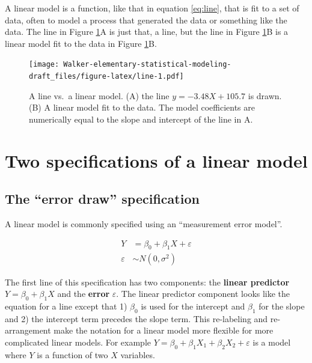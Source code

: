 \documentclass[]{book}
\begin{document}
A linear model is a function, like that in equation \eqref{eq:line}, that is fit to a set of data, often to model a process that generated the data or something like the data. The line in Figure \ref{fig:line}A is just that, a line, but the line in Figure \ref{fig:line}B is a linear model fit to the data in Figure \ref{fig:line}B.

\begin{figure}
\centering
\texttt{[image: Walker-elementary-statistical-modeling-draft\_files/figure-latex/line-1.pdf]}
\caption{\label{fig:line}A line vs.~a linear model. (A) the line \(y=-3.48X + 105.7\) is drawn. (B) A linear model fit to the data. The model coefficients are numerically equal to the slope and intercept of the line in A.}
\end{figure}

\hypertarget{two-specifications-of-a-linear-model}{%
\section{Two specifications of a linear model}\label{two-specifications-of-a-linear-model}}

\hypertarget{the-error-draw-specification}{%
\subsection{The ``error draw'' specification}\label{the-error-draw-specification}}

A linear model is commonly specified using an ``measurement error model''.

\begin{align}
Y &= \beta_0 + \beta_1 X + \varepsilon\\
\varepsilon &\sim N(0, \sigma^2)
\label{eq:error-spec}
\end{align}

The first line of this specification has two components: the \textbf{linear predictor} \(Y = \beta_0 + \beta_1 X\) and the \textbf{error} \(\varepsilon\). The linear predictor component looks like the equation for a line except that 1) \(\beta_0\) is used for the intercept and \(\beta_1\) for the slope and 2) the intercept term precedes the slope term. This re-labeling and re-arrangement make the notation for a linear model more flexible for more complicated linear models. For example \(Y = \beta_0 + \beta_1 X_1 + \beta_2 X_2 + \varepsilon\) is a model where \(Y\) is a function of two \(X\) variables.
\end{document}
